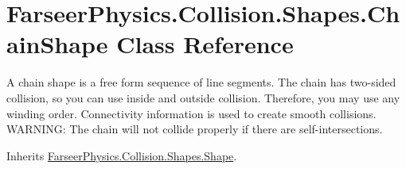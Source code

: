 \hypertarget{class_farseer_physics_1_1_collision_1_1_shapes_1_1_chain_shape}{\section{Farseer\+Physics.\+Collision.\+Shapes.\+Chain\+Shape Class Reference}
\label{class_farseer_physics_1_1_collision_1_1_shapes_1_1_chain_shape}
}


A chain shape is a free form sequence of line segments. The chain has two-\/sided collision, so you can use inside and outside collision. Therefore, you may use any winding order. Connectivity information is used to create smooth collisions. W\+A\+R\+N\+I\+N\+G\+: The chain will not collide properly if there are self-\/intersections.  




Inherits \hyperlink{class_farseer_physics_1_1_collision_1_1_shapes_1_1_shape}{Farseer\+Physics.\+Collision.\+Shapes.\+Shape}.

